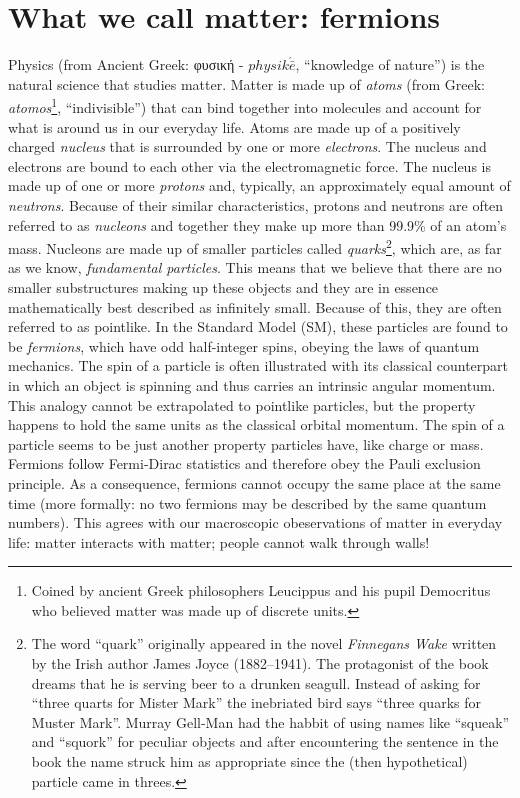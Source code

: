 \section{What we call matter: fermions}
\label{sec:fermions}
Physics (from Ancient Greek: \gr φυσική \en - $physik\acute{\bar{e}}$, ``knowledge of nature'') is the natural science that studies matter.
Matter is made up of \textit{atoms} (from Greek: \textit{atomos}\footnote{Coined by ancient Greek philosophers Leucippus and his pupil Democritus who believed matter was made up of discrete units.}, ``indivisible'') that can bind together into molecules and account for what is around us in our everyday life.
Atoms are made up of a positively charged \textit{nucleus} that is surrounded by one or more \textit{electrons}. The nucleus and electrons are bound to each other via the electromagnetic force.
The nucleus is made up of one or more \textit{protons} and, typically, an approximately equal amount of \textit{neutrons}. Because of their similar characteristics, protons and neutrons are often referred to as \textit{nucleons} and together they make up more than 99.9\% of an atom's mass.
Nucleons are made up of smaller particles called \textit{quarks}\footnote{The word ``quark'' originally appeared in the novel \textit{Finnegans Wake} written by the Irish author James Joyce (1882–1941). The protagonist of the book dreams that he is serving beer to a drunken seagull. Instead of asking for ``three quarts for Mister Mark'' the inebriated bird says ``three quarks for Muster Mark''. Murray Gell-Man had the habbit of using names like ``squeak'' and ``squork'' for peculiar objects and after encountering the sentence in the book the name struck him as appropriate since the (then hypothetical) particle came in threes.}, which are, as far as we know, \textit{fundamental particles}. This means that we believe that there are no smaller substructures making up these objects and they are in essence mathematically best described as infinitely small.
Because of this, they are often referred to as pointlike.
In the Standard Model (SM), these particles are found to be \textit{fermions}, which have odd half-integer spins, obeying the laws of quantum mechanics.
The spin of a particle is often illustrated with its classical counterpart in which an object is spinning and thus carries an intrinsic angular momentum.
This analogy cannot be extrapolated to pointlike particles, but the property happens to hold the same units as the classical orbital momentum.
The spin of a particle seems to be just another property particles have, like charge or mass.
Fermions follow Fermi-Dirac statistics and therefore obey the Pauli exclusion principle. As a consequence, fermions cannot occupy the same place at the same time (more formally: no two fermions may be described by the same quantum numbers). This agrees with our macroscopic obeservations of matter in everyday life: matter interacts with matter; people cannot walk through walls!

